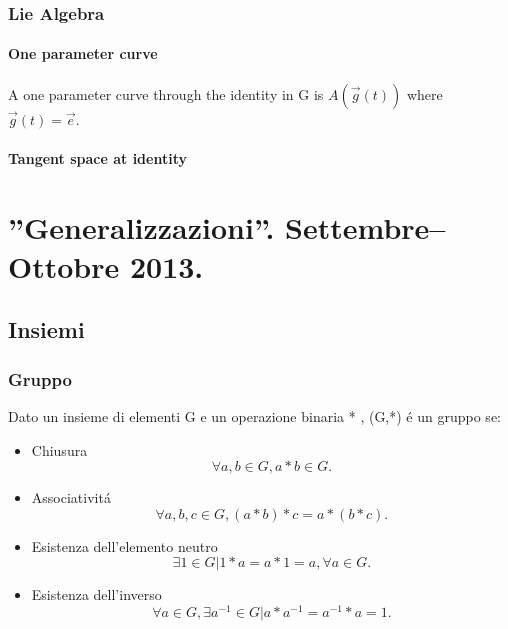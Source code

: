 \documentclass[oneside,12pt]{memoir}
\begin{document}
\section{Lie Algebra}

\subsection{One parameter curve}
A one parameter curve through the identity in G is $A(\vec{g}(t))$ where $\vec{g}(t)=\vec{e}$.

\subsection{Tangent space at identity}




\appendix

\part{''Generalizzazioni''. Settembre--Ottobre 2013.}


\chapter{Insiemi}
\PartialToc

\section{Gruppo}


Dato un insieme di elementi G e un operazione binaria * , (G,*) \'e un gruppo se:
\begin{itemize}
\item Chiusura
\begin{equation*}
\forall a,b\in G , a*b\in G.
\end{equation*}
\item Associativit\'a
\begin{equation*}
\forall a,b,c\in G , (a*b)*c=a*(b*c).
\end{equation*}
\item Esistenza dell'elemento neutro
\begin{equation*}
\exists 1\in G | 1*a=a*1=a , \forall a\in G.
\end{equation*}
\item Esistenza dell'inverso
\begin{equation*}
\forall a\in G, \exists a^{-1} \in G | a*a^{-1}=a^{-1}*a=1.
\end{equation*}
\end{itemize}
\end{document}
